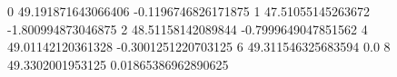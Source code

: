 0 49.191871643066406 -0.1196746826171875
1 47.51055145263672 -1.800994873046875
2 48.51158142089844 -0.7999649047851562
4 49.01142120361328 -0.3001251220703125
6 49.311546325683594 0.0
8 49.3302001953125 0.01865386962890625
